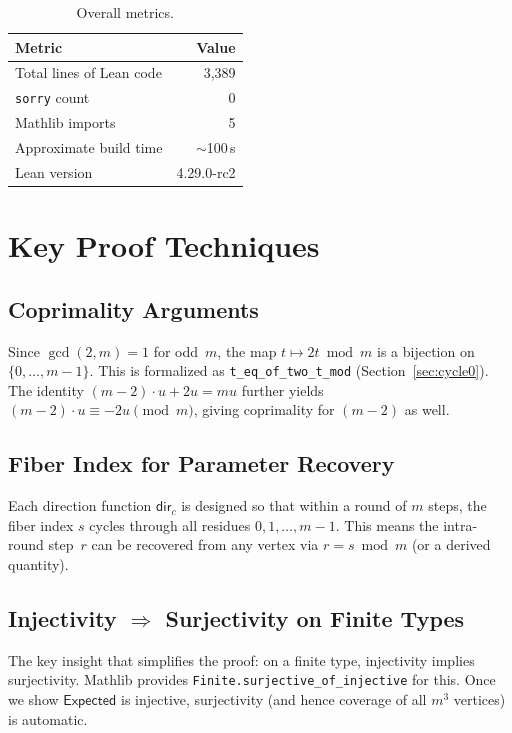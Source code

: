 \documentclass[11pt,a4paper]{article}
\begin{document}
\begin{table}[h]
\centering
\begin{tabular}{lr}
\toprule
\textbf{Metric} & \textbf{Value} \\
\midrule
Total lines of Lean code & 3{,}389 \\
\texttt{sorry} count & 0 \\
Mathlib imports & 5 \\
Approximate build time & $\sim$100\,s \\
Lean version & 4.29.0-rc2 \\
\bottomrule
\end{tabular}
\caption{Overall metrics.}
\end{table}

\section{Key Proof Techniques}
\label{sec:techniques}

\subsection{Coprimality Arguments}

Since $\gcd(2, m) = 1$ for odd~$m$, the map $t \mapsto 2t \bmod m$ is a bijection
on $\{0, \ldots, m{-}1\}$.  This is formalized as \texttt{t\_eq\_of\_two\_t\_mod}
(Section~\ref{sec:cycle0}).  The identity $(m{-}2) \cdot u + 2u = mu$ further yields
$(m{-}2) \cdot u \equiv -2u \pmod{m}$, giving coprimality for $(m{-}2)$ as well.

\subsection{Fiber Index for Parameter Recovery}

Each direction function $\mathsf{dir}_c$ is designed so that within a round of $m$ steps,
the fiber index $s$ cycles through all residues $0, 1, \ldots, m{-}1$.  This means the
intra-round step~$r$ can be recovered from any vertex via $r = s \bmod m$
(or a derived quantity).

\subsection{Injectivity $\Rightarrow$ Surjectivity on Finite Types}

The key insight that simplifies the proof: on a finite type, injectivity implies
surjectivity.  Mathlib provides \texttt{Finite.surjective\_of\_injective} for this.
Once we show $\mathsf{Expected}$ is injective, surjectivity (and hence coverage of all
$m^3$ vertices) is automatic.
\end{document}
